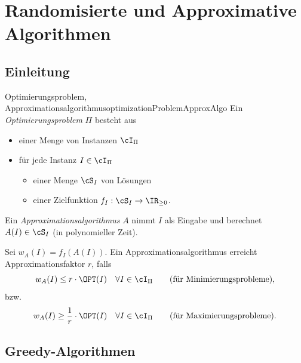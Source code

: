 \documentclass[language=ngerman,algolist]{TemplateLecture}
\begin{document}
\setcounter{chapter}{0}



\part{Randomisierte und Approximative Algorithmen}

\chapter{Einleitung}
\begin{defi}{Optimierungsproblem, Approximationsalgorithmus}{optimizationProblemApproxAlgo}
    Ein \emph{Optimierungsproblem} $\Pi$ besteht aus
    \begin{itemize}
        \item einer Menge von Instanzen $\cI_\Pi$
        \item für jede Instanz $ I \in \cI_\Pi$
        \begin{itemize}
            \item einer Menge $\cS_I$ von Lösungen
            \item einer Zielfunktion $f_I: \cS_I \to \IR_{\geq 0}$.
        \end{itemize} 
    \end{itemize}
    Ein \emph{Approximationsalgorithmus} $A$ nimmt $I$ als Eingabe und berechnet $A(I) \in \cS_I$ (in polynomieller Zeit).

    Sei $w_A(I) = f_I(A(I))$. Ein Approximationsalgorithmus erreicht Approximationsfaktor $r$, falls 
    \begin{equation*}
        w_A(I) \leq r \cdot \OPT(I) \quad \forall I \in \cI_\Pi \quad \quad \text{(für Minimierungsprobleme)},
    \end{equation*}
    bzw.
    \begin{equation*}
        w_A(I) \geq \frac{1}{r} \cdot \OPT(I) \quad \forall I \in \cI_\Pi \quad \quad \text{(für Maximierungsprobleme)}.
    \end{equation*}
\end{defi}

\chapter{Greedy-Algorithmen}
\end{document}
